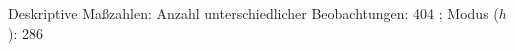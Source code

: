 				\label{tableValues:asys02_g1}
				\vspace*{-\baselineskip}
                    \begin{noten}
                	    \note{} Deskriptive Maßzahlen:
                	    Anzahl unterschiedlicher Beobachtungen: 404%
                	    ; 
                	      Modus ($h$): 286
                     \end{noten}


